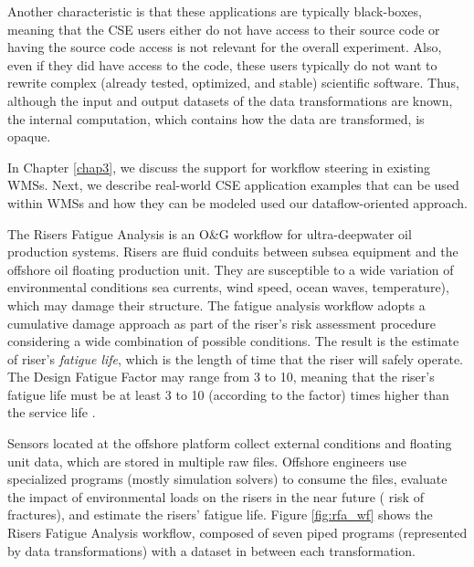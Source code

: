 Another characteristic is that these applications are typically black-boxes, meaning that the CSE users either do not have access to their source code or having the source code access is not relevant for the overall experiment. Also, even if they did have access to the code, these users typically do not want to rewrite complex (already tested,
optimized, and stable) scientific software.
Thus, although the input and output datasets of the data transformations are known,
the internal computation, which contains how the data are transformed, is opaque.

In Chapter \ref{chap3}, we discuss the support for workflow steering in existing WMSs. Next, we describe real-world CSE application examples that can be used within WMSs and how they can be modeled used our dataflow-oriented approach.

%

 \label{sub_rfa}

The Risers Fatigue Analysis is an O\&G workflow for ultra-deepwater oil production systems.
Risers are fluid conduits between subsea
equipment and the offshore oil floating production unit. They are
susceptible to a wide variation of environmental conditions
\eg{} sea currents, wind speed, ocean waves, temperature), which
may damage their structure. The fatigue analysis workflow adopts a
cumulative damage approach as part of the riser's risk assessment
procedure considering a wide combination of possible conditions. The
result is the estimate of riser's \emph{fatigue life}, which is the
length of time that the riser will safely operate. The Design Fatigue
Factor may range from 3 to 10, meaning that the riser's fatigue
life must be at least 3 to 10 (according to the factor)
 times higher than the service life
\cite{DetNorseVeritas2010Recommended}.

Sensors located at the offshore platform collect external conditions and
floating unit data, which are stored in multiple raw files. Offshore
engineers use specialized programs (mostly simulation solvers) to
consume the files, evaluate the impact of environmental loads on the
risers in the near future (\eg{} risk of fractures), and estimate
the risers' fatigue life. 
Figure \ref{fig:rfa_wf} shows the Risers Fatigue Analysis workflow, composed of seven piped programs (represented by data transformations) with a dataset in between each transformation.

